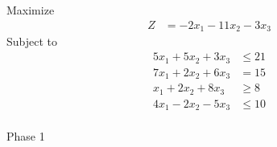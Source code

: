 \documentclass[12pt]{article}
\begin{document}
\subsection{}
Maximize
\begin{align*}
Z                    & = -2x_{1}-11x_{2}-3x_{3}
\end{align*}
Subject to
\begin{align*}
5x_{1}+5x_{2}+3x_{3} & \le 21 \\
7x_{1}+2x_{2}+6x_{3} & = 15   \\
x_{1}+2x_{2}+8x_{3}  & \ge 8  \\
4x_{1}-2x_{2}-5x_{3} & \le 10 \\
\end{align*}

Phase 1                                                                                                                                                                                                                    \\[5pt]
\end{document}
